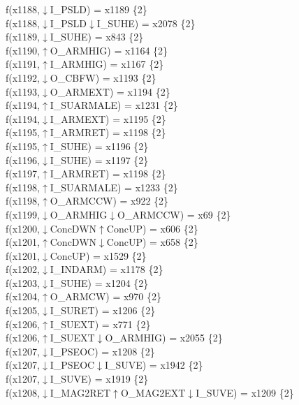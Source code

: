 f(x1188,$\downarrow$I\_PSLD) = x1189 \{2\} \\  
f(x1188,$\downarrow$I\_PSLD$\downarrow$I\_SUHE) = x2078 \{2\} \\  
f(x1189,$\downarrow$I\_SUHE) = x843 \{2\} \\  
f(x1190,$\uparrow$O\_ARMHIG) = x1164 \{2\} \\  
f(x1191,$\uparrow$I\_ARMHIG) = x1167 \{2\} \\  
f(x1192,$\downarrow$O\_CBFW) = x1193 \{2\} \\  
f(x1193,$\downarrow$O\_ARMEXT) = x1194 \{2\} \\  
f(x1194,$\uparrow$I\_SUARMALE) = x1231 \{2\} \\  
f(x1194,$\downarrow$I\_ARMEXT) = x1195 \{2\} \\  
f(x1195,$\uparrow$I\_ARMRET) = x1198 \{2\} \\  
f(x1195,$\uparrow$I\_SUHE) = x1196 \{2\} \\  
f(x1196,$\downarrow$I\_SUHE) = x1197 \{2\} \\  
f(x1197,$\uparrow$I\_ARMRET) = x1198 \{2\} \\  
f(x1198,$\uparrow$I\_SUARMALE) = x1233 \{2\} \\  
f(x1198,$\uparrow$O\_ARMCCW) = x922 \{2\} \\  
f(x1199,$\downarrow$O\_ARMHIG$\downarrow$O\_ARMCCW) = x69 \{2\} \\  
f(x1200,$\downarrow$ConcDWN$\uparrow$ConcUP) = x606 \{2\} \\  
f(x1201,$\uparrow$ConcDWN$\downarrow$ConcUP) = x658 \{2\} \\  
f(x1201,$\downarrow$ConcUP) = x1529 \{2\} \\  
f(x1202,$\downarrow$I\_INDARM) = x1178 \{2\} \\  
f(x1203,$\downarrow$I\_SUHE) = x1204 \{2\} \\  
f(x1204,$\uparrow$O\_ARMCW) = x970 \{2\} \\  
f(x1205,$\downarrow$I\_SURET) = x1206 \{2\} \\  
f(x1206,$\uparrow$I\_SUEXT) = x771 \{2\} \\  
f(x1206,$\uparrow$I\_SUEXT$\downarrow$O\_ARMHIG) = x2055 \{2\} \\  
f(x1207,$\downarrow$I\_PSEOC) = x1208 \{2\} \\  
f(x1207,$\downarrow$I\_PSEOC$\downarrow$I\_SUVE) = x1942 \{2\} \\  
f(x1207,$\downarrow$I\_SUVE) = x1919 \{2\} \\  
f(x1208,$\downarrow$I\_MAG2RET$\uparrow$O\_MAG2EXT$\downarrow$I\_SUVE) = x1209 \{2\} \\  
